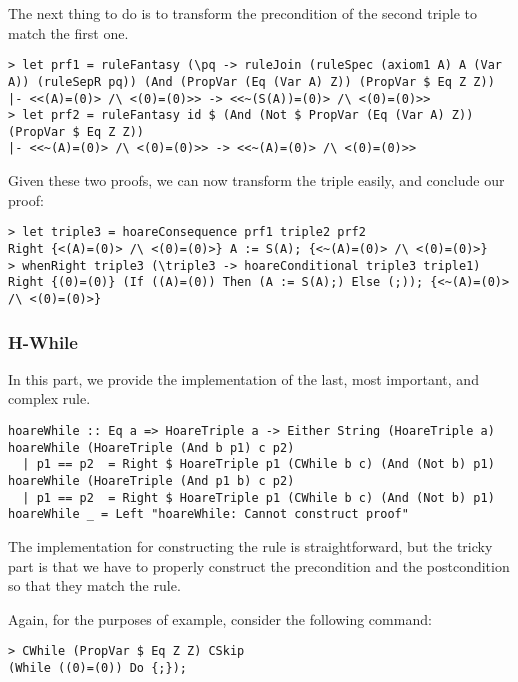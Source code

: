 \documentclass{article}
\begin{document}
The next thing to do is to transform the precondition of the second triple to match the first one.

\begin{lstlisting}
> let prf1 = ruleFantasy (\pq -> ruleJoin (ruleSpec (axiom1 A) A (Var A)) (ruleSepR pq)) (And (PropVar (Eq (Var A) Z)) (PropVar $ Eq Z Z))
|- <<(A)=(0)> /\ <(0)=(0)>> -> <<~(S(A))=(0)> /\ <(0)=(0)>>
> let prf2 = ruleFantasy id $ (And (Not $ PropVar (Eq (Var A) Z)) (PropVar $ Eq Z Z))
|- <<~(A)=(0)> /\ <(0)=(0)>> -> <<~(A)=(0)> /\ <(0)=(0)>>
\end{lstlisting}

Given these two proofs, we can now transform the triple easily, and conclude our proof:

\begin{lstlisting}
> let triple3 = hoareConsequence prf1 triple2 prf2
Right {<(A)=(0)> /\ <(0)=(0)>} A := S(A); {<~(A)=(0)> /\ <(0)=(0)>}
> whenRight triple3 (\triple3 -> hoareConditional triple3 triple1)
Right {(0)=(0)} (If ((A)=(0)) Then (A := S(A);) Else (;)); {<~(A)=(0)> /\ <(0)=(0)>}
\end{lstlisting}

\subsubsection{H-While}

In this part, we provide the implementation of the last, most important, and complex rule.

\begin{lstlisting}
hoareWhile :: Eq a => HoareTriple a -> Either String (HoareTriple a)
hoareWhile (HoareTriple (And b p1) c p2)
  | p1 == p2  = Right $ HoareTriple p1 (CWhile b c) (And (Not b) p1)
hoareWhile (HoareTriple (And p1 b) c p2)
  | p1 == p2  = Right $ HoareTriple p1 (CWhile b c) (And (Not b) p1)
hoareWhile _ = Left "hoareWhile: Cannot construct proof"
\end{lstlisting}

The implementation for constructing the rule is straightforward, but the tricky part is that we have to properly construct the precondition and the postcondition so that they match the rule.

Again, for the purposes of example, consider the following command:

\begin{lstlisting}
> CWhile (PropVar $ Eq Z Z) CSkip
(While ((0)=(0)) Do {;});
\end{lstlisting}
\end{document}
